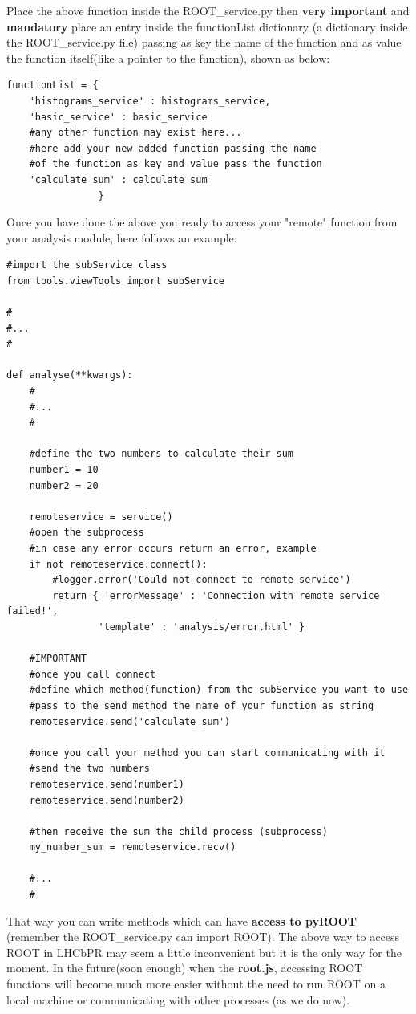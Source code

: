 \documentclass{lhcbnote}
\begin{document}
Place the above function inside the ROOT\_service.py then \textbf{very important} and \textbf{mandatory} place an entry inside the functionList dictionary (a dictionary inside the ROOT\_service.py file) passing as key the name of the function and as value the function itself(like a pointer to the function), shown as below:

\begin{verbatim}
functionList = {
    'histograms_service' : histograms_service,
    'basic_service' : basic_service
    #any other function may exist here...
    #here add your new added function passing the name
    #of the function as key and value pass the function
    'calculate_sum' : calculate_sum
                }
\end{verbatim}

Once you have done the above you ready to access your "remote" function from your analysis module, here follows an example:

\begin{verbatim}
#import the subService class
from tools.viewTools import subService

#
#...
#

def analyse(**kwargs):
    #
    #...
    #

    #define the two numbers to calculate their sum    
    number1 = 10
    number2 = 20
    
    remoteservice = service()
    #open the subprocess
    #in case any error occurs return an error, example
    if not remoteservice.connect():
        #logger.error('Could not connect to remote service')
        return { 'errorMessage' : 'Connection with remote service failed!', 
                'template' : 'analysis/error.html' }
    
    #IMPORTANT    
    #once you call connect
    #define which method(function) from the subService you want to use
    #pass to the send method the name of your function as string  
    remoteservice.send('calculate_sum')   
    
    #once you call your method you can start communicating with it
    #send the two numbers
    remoteservice.send(number1)
    remoteservice.send(number2)
    
    #then receive the sum the child process (subprocess)
    my_number_sum = remoteservice.recv()
    
    #...
    #
\end{verbatim}

That way you can write methods which can have \textbf{access to pyROOT} (remember the ROOT\_service.py can import ROOT). The above way to access ROOT in LHCbPR may seem a little inconvenient but it is the only way for the moment. In the future(soon enough) when the \textbf{root.js}, accessing ROOT functions will become much more easier without the need to run ROOT on a local machine or communicating with other processes (as we do now).
\end{document}
